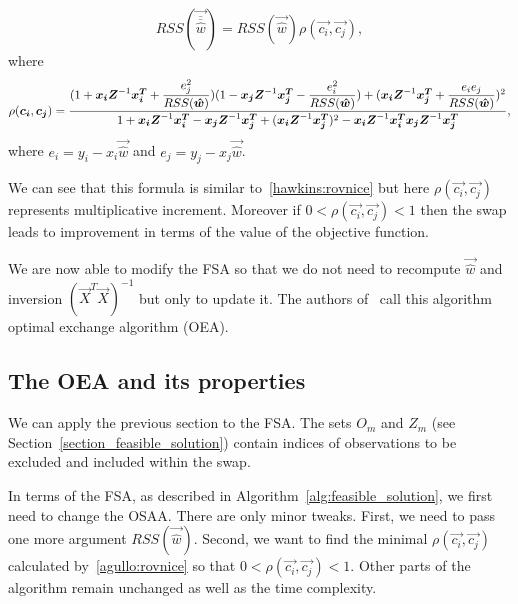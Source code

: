 \begin{equation} \label{updaterss}
    RSS(\vec{\overline{\overline{\hat{w}}}})  = RSS(\vec{\hat{w}})\rho(\vec{c_i}, \vec{c_j}),
\end{equation}
where
\begin{equation} \label{agullo:rovnice}
    \rho(\vec{c_i}, \vec{c_j}) = \\
     \dfrac
     {(1+\vec{x_i}\vec{Z}^{-1}\vec{x_i^T} + \dfrac{e_j^2}{RSS(\vec{\hat{w}})})
        (1 - \vec{x_j}\vec{Z}^{-1}\vec{x_j^T} -  \dfrac{e_i^2}{RSS(\vec{\hat{w}})} )+
        (\vec{x_i}\vec{Z}^{-1}\vec{x_j^T} + \dfrac{e_i e_j}{RSS(\vec{\hat{w}})} )^2}
    {1 + \vec{x_i}\vec{Z}^{-1}\vec{x_i^T}  - \vec{x_j}\vec{Z}^{-1}\vec{x_j^T}  + ( \vec{x_i}\vec{Z}^{-1}\vec{x_j^T})^2 -   \vec{x_i}\vec{Z}^{-1}\vec{x_i^T}\vec{x_j}\vec{Z}^{-1}\vec{x_j^T} },
\end{equation}
where $e_i = y_i - x_i\vec{\hat{w}}$ and $e_j = y_j - x_j\vec{\hat{w}}$.

We can see that this formula is similar to~\eqref{hawkins:rovnice} but here $\rho(\vec{c_i}, \vec{c_j})$ represents multiplicative increment. Moreover if $0 < \rho(\vec{c_i}, \vec{c_j})< 1$ then the swap leads to improvement in terms of the value of the objective function.

We are now able to modify the FSA so that we do not need to recompute $\vec{\hat{w}}$ and inversion $(\vec{X}^T \vec{X})^{-1}$ but only to update it. The authors of~\cite{agullo2001new} call this algorithm optimal exchange algorithm (OEA).






\subsection{The OEA and its properties}
We can apply the previous section to the FSA. The sets $O_m$ and $Z_m$ (see Section~\ref{section_feasible_solution}) contain indices of observations to be excluded and included within the swap.

In terms of the FSA, as described in Algorithm~\ref{alg:feasible_solution}, we first need to change the OSAA.  There are only minor tweaks. First, we need to pass one more argument $RSS(\vec{\hat{w}})$. Second, we want to find the minimal $\rho(\vec{c_i}, \vec{c_j})$ calculated by~\eqref{agullo:rovnice} so that $0 < \rho(\vec{c_i}, \vec{c_j}) < 1 $. Other parts of the algorithm remain unchanged as well as the time complexity.


